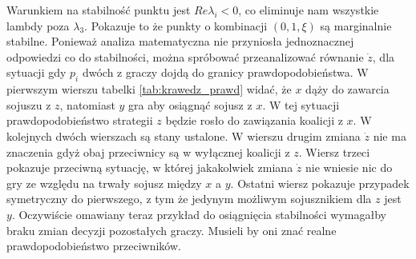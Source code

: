 Warunkiem na stabilność punktu jest $Re \lambda_i < 0$, co eliminuje nam wszystkie lambdy poza $\lambda_3$. Pokazuje to że punkty o kombinacji $(0,1,\xi)$ są marginalnie stabilne.
Ponieważ analiza matematyczna nie przyniosła jednoznacznej odpowiedzi co do stabilności, można spróbować przeanalizować równanie $\dot{z}$, dla sytuacji gdy $p_i$ dwóch z graczy dojdą do granicy prawdopodobieństwa.
W pierwszym wierszu tabelki \ref{tab:krawedz_prawd} widać, że $x$ dąży do zawarcia sojuszu z $z$, natomiast $y$ gra aby osiągnąć sojusz z $x$. W tej sytuacji prawdopodobieństwo strategii $z$ będzie rosło do zawiązania koalicji z $x$. W kolejnych dwóch wierszach są stany ustalone. W wierszu drugim zmiana $\dot{z}$ nie ma znaczenia gdyż obaj przeciwnicy są w wyłącznej koalicji z $z$. Wiersz trzeci pokazuje przeciwną sytuację, w której jakakolwiek zmiana $\dot{z}$ nie wniesie nic do gry ze względu na trwały sojusz między $x$ a $y$. Ostatni wiersz pokazuje przypadek symetryczny do pierwszego, z tym że jedynym możliwym sojusznikiem dla $z$ jest $y$. Oczywiście omawiany teraz przykład do osiągnięcia stabilności wymagałby braku zmian decyzji pozostałych graczy. Musieli by oni znać realne prawdopodobieństwo przeciwników.


